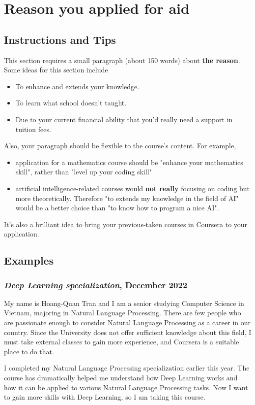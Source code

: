 \chapter{Reason you applied for aid}

\section{Instructions and Tips}
This section requires a small paragraph (about 150 words) about \textbf{the reason}. Some ideas for this section include
\begin{itemize}
\item To enhance and extends your knowledge.
\item To learn what school doesn't taught.
\item Due to your current financial ability that you'd really need a support in tuition fees.
\end{itemize}
Also, your paragraph should be flexible to the course's content. For example, 
\begin{itemize}
\item application for a mathematics course should be "enhance your mathematics skill", rather than "level up your coding skill"
\item artificial intelligence-related courses would \textbf{not really} focusing on coding but more theoretically. Therefore "to extends my knowledge in the field of AI" would be a better choice than "to know how to program a nice AI".
\end{itemize}
It's also a brilliant idea to bring your previous-taken courses in Coursera to your application.

\section{Examples}
\subsection{\textit{Deep Learning specialization}, December 2022}
My name is Hoang-Quan Tran and I am a senior studying Computer Science in Vietnam, majoring in Natural Language Processing. There are few people who are passionate enough to consider Natural Language Processing as a career in our country. Since the University does not offer sufficient knowledge about this field, I must take external classes to gain more experience, and Coursera is a suitable place to do that. 

I completed my Natural Language Processing specialization earlier this year. The course has dramatically helped me understand how Deep Learning works and how it can be applied to various Natural Language Processing tasks. Now I want to gain more skills with Deep Learning, so I am taking this course. 

